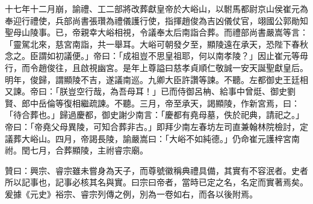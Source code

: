十七年十二月崩，諭禮、工二部將改葬獻皇帝於大峪山，以駙馬都尉京山侯崔元為奉迎行禮使，兵部尚書張瓚為禮儀護行使，指揮趙俊為吉凶儀仗官，翊國公郭勛知聖母山陵事。已，帝親幸大峪相視，令議奉太后南詣合葬。而禮部尚書嚴嵩等言：「靈駕北來，慈宮南詣，共一舉耳。大峪可朝發夕至，顯陵遠在承天，恐陛下春秋念之。臣謂如初議便。」帝曰：「成祖豈不思皇祖耶，何以南孝陵？」因止崔元等毋行，而令趙俊往，且啟視幽宮。是年上尊謚曰慈孝貞順仁敬誠一安天誕聖獻皇后。明年，俊歸，謂顯陵不吉，遂議南巡。九卿大臣許讚等諫。不聽。左都御史王廷相又諫。帝曰：「朕豈空行哉，為吾母耳！」已而侍御呂柟、給事中曾烶、御史劉賢、郎中岳倫等復相繼疏諫。不聽。三月，帝至承天，謁顯陵，作新宮焉，曰：「待合葬也。」歸過慶都，御史謝少南言：「慶都有堯母墓，佚於祀典，請祀之。」帝曰：「帝堯父母異陵，可知合葬非古。」即拜少南左春坊左司直兼翰林院檢討，定議葬大峪山。四月，帝謁長陵，諭嚴嵩曰：「大峪不如純德。」仍命崔元護梓宮南祔。閏七月，合葬顯陵，主祔睿宗廟。

贊曰：興宗、睿宗雖未嘗身為天子，而尊號徽稱典禮具備，其實有不容泯者。史者所以記事也，記事必核其名與實。曰宗曰帝者，當時已定之名，名定而實著焉矣。爰據《元史》裕宗、睿宗列傳之例，別為一卷如右，而各以後附焉。

